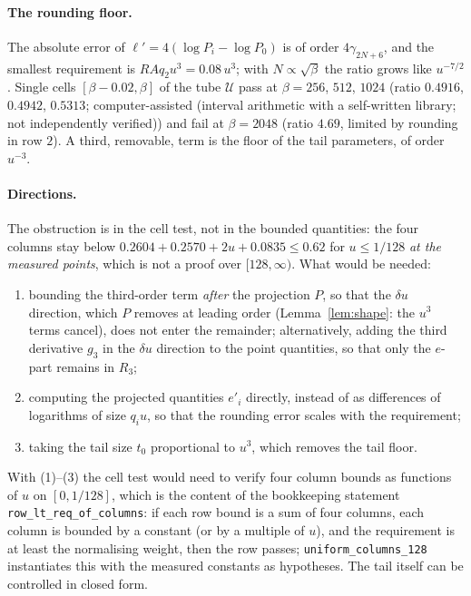 \documentclass[11pt,a4paper]{article}
\theoremstyle{definition}
\theoremstyle{remark}
\newcommand{\code}[1]{\texttt{#1}}
\newcommand{\cU}{\mathcal{U}}
\newcommand{\IA}{computer-assisted (interval arithmetic with a self-written library; not independently verified)}
\begin{document}
\paragraph{The rounding floor.}
The absolute error of $\ell'=4(\log P_i-\log P_0)$ is of order $4\gamma_{2N+6}$, and the smallest requirement is $RAq_2u^3=0.08\,u^3$; with $N\propto\sqrt\beta$ the ratio grows like $u^{-7/2}$.
Single cells $[\beta-0.02,\beta]$ of the tube $\cU$ pass at $\beta=256$, $512$, $1024$ (ratio $0.4916$, $0.4942$, $0.5313$; \IA) and fail at $\beta=2048$ (ratio $4.69$, limited by rounding in row $2$).
A third, removable, term is the floor of the tail parameters, of order $u^{-3}$.

\paragraph{Directions.}
The obstruction is in the cell test, not in the bounded quantities: the four columns stay below $0.2604+0.2570+2u+0.0835\le0.62$ for $u\le1/128$ \emph{at the measured points}, which is not a proof over $[128,\infty)$.
What would be needed:
\begin{enumerate}[nosep]
\item bounding the third-order term \emph{after} the projection $P$, so that the $\delta u$ direction, which $P$ removes at leading order (Lemma~\ref{lem:shape}: the $u^3$ terms cancel), does not enter the remainder; alternatively, adding the third derivative $g_3$ in the $\delta u$ direction to the point quantities, so that only the $e$-part remains in $R_3$;
\item computing the projected quantities $e'_i$ directly, instead of as differences of logarithms of size $q_iu$, so that the rounding error scales with the requirement;
\item taking the tail size $t_0$ proportional to $u^3$, which removes the tail floor.
\end{enumerate}
With (1)--(3) the cell test would need to verify four column bounds as functions of $u$ on $[0,1/128]$, which is the content of the bookkeeping statement \code{row\_lt\_req\_of\_columns}: if each row bound is a sum of four columns, each column is bounded by a constant (or by a multiple of $u$), and the requirement is at least the normalising weight, then the row passes; \code{uniform\_columns\_128} instantiates this with the measured constants as hypotheses.
The tail itself can be controlled in closed form.
\end{document}
